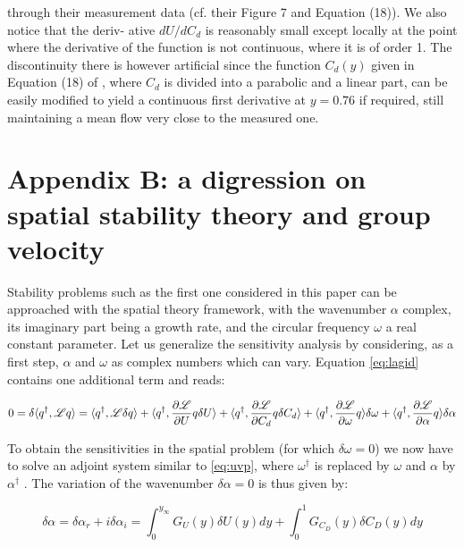 through their measurement data (cf. their Figure 7 and Equation (18)). We also notice that the deriv-
ative $dU/dC_d$ is reasonably small except locally at the point where the derivative of the function is
not continuous, where it is of order 1. The discontinuity there is however artificial since the function
$C_d(y)$ given in Equation (18) of \citet{ghisalberti2004limited}, where $C_d$ is divided into a parabolic and a
linear part, can be easily modified to yield a continuous first derivative at $y = 0.76$ if required, still
maintaining a mean flow very close to the measured one.

\section*{Appendix B: a digression on spatial stability theory and group velocity}

Stability problems such as the first one considered in this paper can be approached with the
spatial theory framework, with the wavenumber $\alpha$ complex, its imaginary part being a growth rate,
and the circular frequency $\omega$ a real constant parameter. Let us generalize the sensitivity analysis by
considering, as a first step, $\alpha$ and $\omega$ as complex numbers which can vary. Equation \ref{eq:lagid} contains one
additional term and reads:

\begin{equation}
0 = \delta \langle q^{\dagger}, \mathscr{L} q \rangle = 
\langle q^{\dagger}, \mathscr{L} \delta q \rangle +
\langle q^{\dagger}, \dfrac{\partial \mathscr{L}}{\partial U}  q \delta U\rangle +
\langle q^{\dagger}, \dfrac{\partial \mathscr{L}}{\partial C_d}  q \delta C_d\rangle +
\langle q^{\dagger}, \dfrac{\partial \mathscr{L}}{\partial \omega}  q \rangle \delta \omega +
\langle q^{\dagger}, \dfrac{\partial \mathscr{L}}{\partial \alpha}  q \rangle \delta \alpha
\label{eq:lagid_spatial}
\end{equation}

To obtain the sensitivities in the spatial problem (for which $\delta \omega = 0$) we now have to solve an adjoint
system similar to \ref{eq:uvp}, where $\omega^{\dagger}$ is replaced by $\omega$ and $\alpha$ by $\alpha^{\dagger}$ . The variation of the wavenumber  $\delta \alpha = 0$ is thus given by:

$$
\delta \alpha =\delta \alpha_r + i \delta \alpha_i= \int_0^{y_{\infty}}  G_U(y) \delta U(y) dy + \int_0^{1}  G_{C_D}(y) \delta C_D(y) dy
$$


